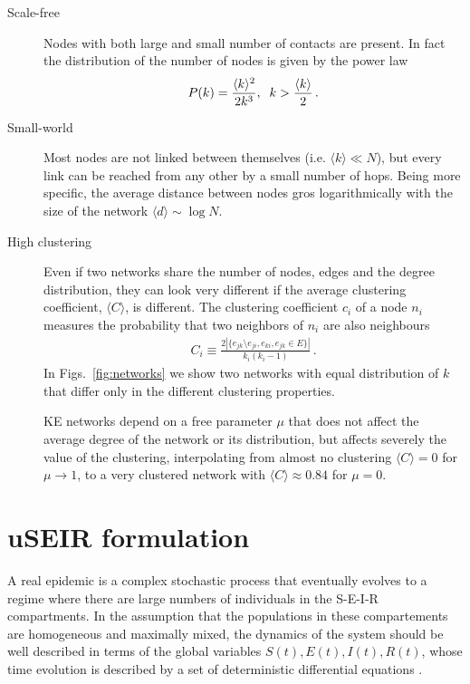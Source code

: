 \documentclass[10pt,letterpaper]{article}
\begin{document}
\begin{description}
\item[Scale-free] Nodes with both large and small number of contacts
  are present. 
  In fact the distribution of the number of nodes is given by
  the power law
 \begin{eqnarray}
  P(k) = {\langle k \rangle^2 \over 2 k^3},\;\;  k > {\langle k\rangle\over 2}\,.
 \end{eqnarray}
  
\item[Small-world] Most nodes are not linked between themselves (i.e. 
  $\langle k\rangle \ll N$), but every link can be reached from any
  other by a small number of hops. 
  Being more specific, the average distance between nodes gros
  logarithmically with the size of the network $\langle d \rangle \sim
  \log N$.
\item[High clustering] Even if two networks share the number of nodes,
  edges and the degree distribution, they can look very different if
  the average clustering coefficient, $\langle C \rangle$, is
  different. The clustering coefficient $c_i$ of a node $n_i$ measures the
  probability that two neighbors of $n_i$ are also neighbours
\begin{eqnarray}
C_i \equiv \frac{2|\{e_{jk}\setminus e_{ji},e_{ki},e_{jk}\in E\}|}{k_i(k_i-1)}\,.
\end{eqnarray}
In Figs.~\ref{fig:networks} we show two networks with equal
distribution of $k$ that differ only in the  different clustering
properties.  

KE networks depend on a free parameter $\mu$ that does not affect the
average degree of the network or its distribution, but affects
severely the value of the clustering, interpolating from almost no
clustering $\langle C\rangle =0$ for $\mu \to 1$, to a very clustered
network with $\langle C\rangle \approx 0.84$ for $\mu=0$.
  
\end{description}


\section*{uSEIR formulation}
\label{sec:useir}

A real epidemic is a complex stochastic process that eventually evolves to a regime where there are  large numbers of individuals in the S-E-I-R compartments. In the assumption that the populations in these compartements are homogeneous and maximally mixed, the dynamics of the system should be well described in terms of the global variables  $S(t), E(t), I(t), R(t)$, whose time evolution is described by a set of deterministic differential equations \cite{Kermack1927,anderson1992infectious}. 
\end{document}

